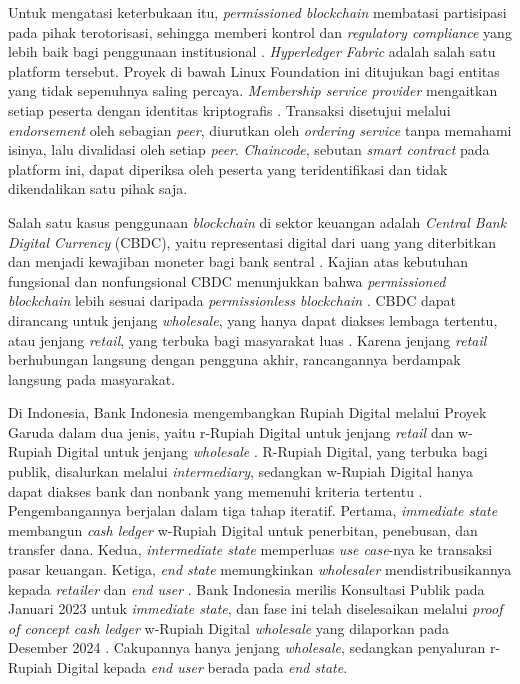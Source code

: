 Untuk mengatasi keterbukaan itu, \textit{permissioned blockchain} membatasi partisipasi pada pihak terotorisasi, sehingga memberi kontrol dan \textit{regulatory compliance} yang lebih baik bagi penggunaan institusional \cite{sethaput2025}. \textit{Hyperledger Fabric} adalah salah satu platform tersebut. Proyek di bawah Linux Foundation ini ditujukan bagi entitas yang tidak sepenuhnya saling percaya. \textit{Membership service provider} mengaitkan setiap peserta dengan identitas kriptografis \cite{androulaki2018}. Transaksi disetujui melalui \textit{endorsement} oleh sebagian \textit{peer}, diurutkan oleh \textit{ordering service} tanpa memahami isinya, lalu divalidasi oleh setiap \textit{peer}. \textit{Chaincode}, sebutan \textit{smart contract} pada platform ini, dapat diperiksa oleh peserta yang teridentifikasi dan tidak dikendalikan satu pihak saja.

Salah satu kasus penggunaan \textit{blockchain} di sektor keuangan adalah \textit{Central Bank Digital Currency} (CBDC), yaitu representasi digital dari uang yang diterbitkan dan menjadi kewajiban moneter bagi bank sentral \cite{unknown2024p}. Kajian atas kebutuhan fungsional dan nonfungsional CBDC menunjukkan bahwa \textit{permissioned blockchain} lebih sesuai daripada \textit{permissionless blockchain} \cite{unknown2022}. CBDC dapat dirancang untuk jenjang \textit{wholesale}, yang hanya dapat diakses lembaga tertentu, atau jenjang \textit{retail}, yang terbuka bagi masyarakat luas \cite{bi_whitepaper2022}. Karena jenjang \textit{retail} berhubungan langsung dengan pengguna akhir, rancangannya berdampak langsung pada masyarakat.

Di Indonesia, Bank Indonesia mengembangkan Rupiah Digital melalui Proyek Garuda dalam dua jenis, yaitu r-Rupiah Digital untuk jenjang \textit{retail} dan w-Rupiah Digital untuk jenjang \textit{wholesale} \cite{bi_whitepaper2022}. R-Rupiah Digital, yang terbuka bagi publik, disalurkan melalui \textit{intermediary}, sedangkan w-Rupiah Digital hanya dapat diakses bank dan nonbank yang memenuhi kriteria tertentu \cite{bi_whitepaper2022, bi_consultative}. Pengembangannya berjalan dalam tiga tahap iteratif. Pertama, \textit{immediate state} membangun \textit{cash ledger} w-Rupiah Digital untuk penerbitan, penebusan, dan transfer dana. Kedua, \textit{intermediate state} memperluas \textit{use case}-nya ke transaksi pasar keuangan. Ketiga, \textit{end state} memungkinkan \textit{wholesaler} mendistribusikannya kepada \textit{retailer} dan \textit{end user} \cite{bi_consultative}. Bank Indonesia merilis Konsultasi Publik pada Januari 2023 untuk \textit{immediate state}, dan fase ini telah diselesaikan melalui \textit{proof of concept} \textit{cash ledger} w-Rupiah Digital \textit{wholesale} yang dilaporkan pada Desember 2024 \cite{bi_garuda_poc}. Cakupannya hanya jenjang \textit{wholesale}, sedangkan penyaluran r-Rupiah Digital kepada \textit{end user} berada pada \textit{end state}.

